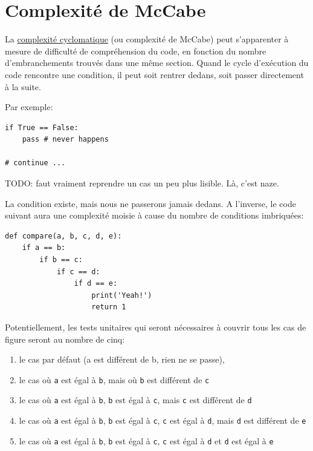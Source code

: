 \documentclass[11pt]{amsbook}
\begin{document}
\hypertarget{x-complexité-de-mccabe}{\section{Complexité de McCabe}}
La \href{https://fr.wikipedia.org/wiki/Nombre_cyclomatique}{complexité cyclomatique} (ou complexité de McCabe) peut s’apparenter à mesure de difficulté de compréhension du code, en fonction du nombre d’embranchements trouvés dans une même section.
Quand le cycle d’exécution du code rencontre une condition, il peut soit rentrer dedans, soit passer directement à la suite.


Par exemple:


\begin{verbatim}
if True == False:
    pass # never happens

# continue ...
\end{verbatim}

TODO: faut vraiment reprendre un cas un peu plus lisible. Là, c’est naze.


La condition existe, mais nous ne passerons jamais dedans.
A l’inverse, le code suivant aura une complexité moisie à cause du nombre de conditions imbriquées:


\begin{verbatim}
def compare(a, b, c, d, e):
    if a == b:
        if b == c:
            if c == d:
                if d == e:
                    print('Yeah!')
                    return 1
\end{verbatim}

Potentiellement, les tests unitaires qui seront nécessaires à couvrir tous les cas de figure seront au nombre de cinq:


\begin{enumerate}

\item{le cas par défaut (a est différent de b, rien ne se passe),}

\item{le cas où \texttt{a} est égal à \texttt{b}, mais où \texttt{b} est différent de \texttt{c}}

\item{le cas où \texttt{a} est égal à \texttt{b}, \texttt{b} est égal à \texttt{c}, mais \texttt{c} est différent de \texttt{d}}

\item{le cas où \texttt{a} est égal à \texttt{b}, \texttt{b} est égal à \texttt{c}, \texttt{c} est égal à \texttt{d}, mais \texttt{d} est différent de \texttt{e}}

\item{le cas où \texttt{a} est égal à \texttt{b}, \texttt{b} est égal à \texttt{c}, \texttt{c} est égal à \texttt{d} et \texttt{d} est égal à \texttt{e}}

\end{enumerate}
\end{document}

